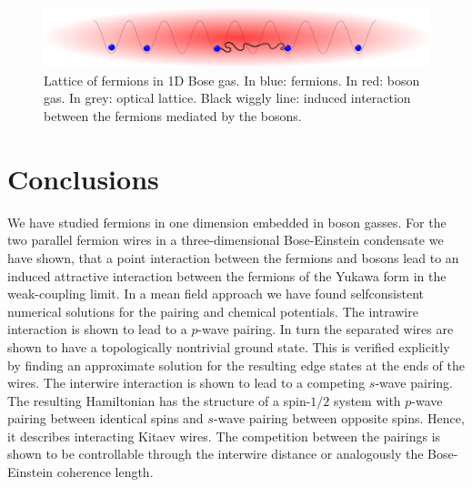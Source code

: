 \documentclass[11pt, twoside]{Thesis}
\begin{document}
\vspace{2.5cm}

\begin{figure}[H]
\center
\includegraphics[width=1\columnwidth]{gasandlattice.eps}
\\ Lattice of fermions in 1D Bose gas. In blue: fermions. In red: boson gas. In grey: optical lattice. Black wiggly line: induced interaction between the fermions mediated by the bosons.   
\end{figure}

\newpage



\part{Conclusions}
\chead{}
We have studied fermions in one dimension embedded in boson gasses. For the two parallel fermion wires in a three-dimensional Bose-Einstein condensate we have shown, that a point interaction between the fermions and bosons lead to an induced attractive interaction between the fermions of the Yukawa form in the weak-coupling limit. In a mean field approach we have found selfconsistent numerical solutions for the pairing and chemical potentials. The intrawire interaction is shown to lead to a $p$-wave pairing. In turn the separated wires are shown to have a topologically nontrivial ground state. This is verified explicitly by finding an approximate solution for the resulting edge states at the ends of the wires. The interwire interaction is shown to lead to a competing $s$-wave pairing. The resulting Hamiltonian has the structure of a spin-$1/2$ system with $p$-wave pairing between identical spins and $s$-wave pairing between opposite spins. Hence, it describes interacting Kitaev wires. The competition between the pairings is shown to be controllable through the interwire distance or analogously the Bose-Einstein coherence length. 
\end{document}
